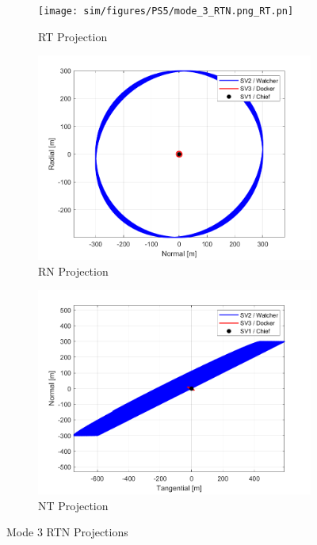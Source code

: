 \begin{figure}[H]
    \centering
    \begin{subfigure}[b]{0.32\linewidth}
        \texttt{[image: sim/figures/PS5/mode\_3\_RTN.png\_RT.pn]}
        \caption{RT Projection}
        \label{fig:mode_3_rt}
    \end{subfigure}
    \begin{subfigure}[b]{0.32\linewidth}
        \includegraphics[width=\linewidth]{sim/figures/PS5/mode_3_RTN.png_RN.png}
        \caption{RN Projection}
        \label{fig:mode_3_rn}
    \end{subfigure}
    \begin{subfigure}[b]{0.32\linewidth}
        \includegraphics[width=\linewidth]{sim/figures/PS5/mode_3_RTN.png_NT.png}
        \caption{NT Projection}
        \label{fig:mode_3_nt}
    \end{subfigure}
    \caption{Mode 3 RTN Projections}
    \label{fig:mode_3_rtn}
\end{figure}

